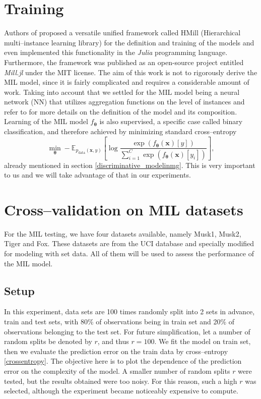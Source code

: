 \section{Training}\label{MILtraining}
Authors of \cite{mandlik} proposed a versatile unified framework called HMill (Hierarchical multi--instance learning library) for the definition and training of the models and even implemented this functionality in the \emph{Julia} programming language. Furthermore, the framework was published as an open-source project entitled \emph{Mill.jl} under the MIT license. The aim of this work is not to rigorously derive the MIL model, since it is fairly complicated and requires a considerable amount of work. Taking into account that we settled for the MIL model being a neural network (NN) that utilizes aggregation functions on the level of instances and refer to \cite{mandlik} for more details on the definition of the model and its composition.   
Learning of the MIL model $f_{\boldsymbol{\theta}}$ is also supervised, a specific case called binary classification, and therefore achieved by minimizing standard cross--entropy 
\begin{equation}\label{crossentropy52}
	\min_{\boldsymbol{\theta}}- \mathbb{E}_{p_{\mathrm{data}}(\boldsymbol{x},y) }\left[\log \frac{\exp\left({f_{\boldsymbol{\theta}}\left(\boldsymbol{x}\right)[y]}\right)}{\sum_{i=1}^C\exp\left({f_{\boldsymbol{\theta}}\left(\boldsymbol{x}\right)[y_i]}\right)} \right],
\end{equation}   
already mentioned in section \ref{discriminative_modelinmg}. This is very important to us and we will take advantage of that in our experiments.
 
\section{Cross--validation on MIL datasets}\label{experimentCV}
For the MIL testing, we have four datasets available, namely Musk1, Musk2, Tiger and Fox. These datasets are from the UCI database and specially modified for modeling with set data.  All of them will be used to assess the performance of the MIL model.
\subsection{Setup}
In this experiment, data sets are 100 times randomly split into 2 sets in advance, train and test sets, with 80\% of observations being in train set and 20\% of observations belonging to the test set. For future simplification, let a number of random splits be denoted by $r$, and thus $r=100$.  We fit the model on train set, then we evaluate the prediction error on the train data by cross--entropy \ref{crossentropy}. The objective here is to plot the dependence of the prediction error on the complexity of the model. A smaller number of random splits $r$ were tested, but the results obtained were too noisy. For this reason, such a high $r$ was selected, although the experiment became noticeably expensive to compute.    \\

